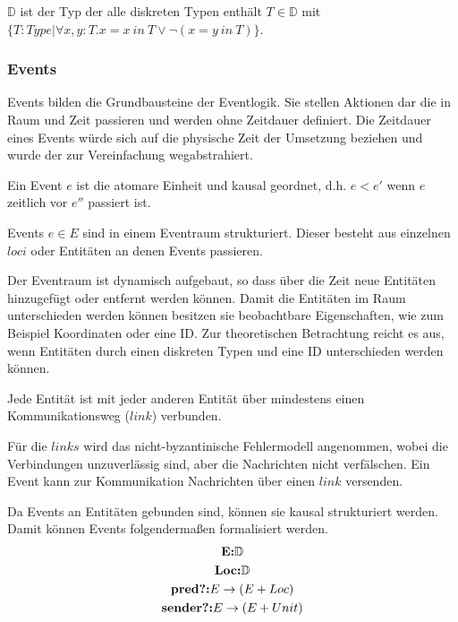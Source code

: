 \begin{defi}
  $\mathbb{D}$ ist der Typ der alle diskreten Typen enthält $T\in\mathbb{D}$ mit $\{T:Type|\forall x,y : T.x = x\ in\ T \vee\neg (x = y\ in\
  T)\}$.
\end{defi}

\subsubsection{Events}
Events bilden die Grundbausteine der Eventlogik.
Sie stellen Aktionen dar die in Raum und Zeit passieren und
werden ohne Zeitdauer definiert.
Die Zeitdauer eines Events würde sich auf die physische Zeit der
Umsetzung beziehen und wurde der zur Vereinfachung
wegabstrahiert.~\cite{bickford2005causal}

\begin{defi}
  Ein Event $e$ ist die atomare Einheit und kausal geordnet, d.h.
  $e< e'$ wenn $e$ zeitlich vor $e''$ passiert ist.
\end{defi}

\begin{defi}
  Events $e\in E$ sind in einem Eventraum strukturiert. Dieser besteht
  aus einzelnen $loci$ oder Entitäten an denen Events passieren.
\end{defi}

Der Eventraum ist dynamisch aufgebaut, so dass über die Zeit neue Entitäten
hinzugefügt oder entfernt werden können. Damit die Entitäten im Raum
unterschieden werden können besitzen sie beobachtbare Eigenschaften, wie zum
Beispiel Koordinaten oder eine ID. Zur theoretischen Betrachtung reicht es aus,
wenn Entitäten durch einen diskreten Typen und eine ID unterschieden werden können.~\cite{bickford2005causal}

\begin{defi}
  Jede Entität ist mit jeder anderen Entität über mindestens
  einen Kommunikationsweg ($link$) verbunden.
\end{defi}

Für die $links$ wird das nicht-byzantinische Fehlermodell angenommen,
wobei die Verbindungen unzuverlässig sind, aber die Nachrichten nicht
verfälschen. Ein Event kann zur Kommunikation Nachrichten über einen
$link$ versenden.

Da Events an Entitäten gebunden sind, können sie kausal strukturiert werden.
Damit können Events folgendermaßen formalisiert werden.
\begin{gather*}
  \textbf{E:}\mathbb{D}\notag\\
  \textbf{Loc:}\mathbb{D}\\
  \textbf{pred?:} E\rightarrow (E+Loc)\\
  \textbf{sender?:} E\rightarrow (E+Unit)
\end{gather*}


